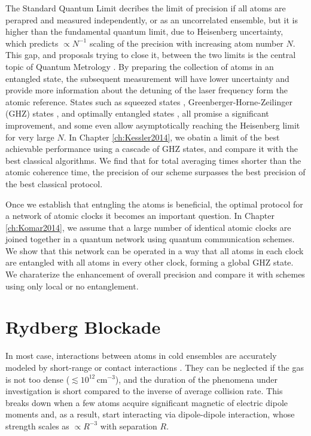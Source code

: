 The Standard Quantum Limit decribes the limit of precision if all atoms are
perapred and measured independently, or as an uncorrelated ensemble, but it is
higher than the fundamental quantum limit, due to Heisenberg uncertainty, which
predicts $\propto N^{-1}$ scaling of the precision with increasing atom number
$N$. This gap, and proposals trying to close it, between the two limits is the
central topic of Quantum Metrology \cite{Giovanetti2011, Escher:2011fn}. By
preparing the collection of atoms in an entangled state, the subsequent
measurement will have lower uncertainty and provide more information about the
detuning of the laser frequency form the atomic reference. States such as
squeezed states \cite{Andre2004, Borregaard2013_nearHeisenberg},
Greenberger-Horne-Zeilinger (GHZ) states \cite{Wineland1998, Bollinger1996}, and
optimally entangled states \cite{Buzek1999, Berry2009},
all promise a significant improvement, and some even allow asymptotically reaching the Heisenberg limit for very large
$N$. In Chapter \ref{ch:Kessler2014}, we obatin a limit of the best achievable
performance using a cascade of GHZ states, and compare it with the best
classical algorithms. We find that for total averaging times shorter than the
atomic coherence time, the precision of our scheme surpasses the best
precision of the best classical protocol.

Once we establish that entngling the atoms is beneficial, the optimal
protocol for a network of atomic clocks it becomes an important question. In
Chapter \ref{ch:Komar2014}, we assume that a large number of identical atomic
clocks are joined together in a quantum network using quantum communication
schemes. We show that this network can be operated in a way that all atoms in
each clock are entangled with all atoms in every other clock, forming a global
GHZ state. We charaterize the enhancement of overall precision and compare it
with schemes using only local or no entanglement.





\section{Rydberg Blockade}
In most case, interactions between atoms in cold ensembles are accurately
modeled by short-range or contact interactions \cite{Cheng2010}.
They can be neglected if the gas is not too dense ($ \lesssim
10^{12}\,\mathrm{cm}^{-3}$), and the duration of the phenomena under
investigation is short compared to the inverse of average collision rate. This
breaks down when a few atoms acquire significant magnetic of electric dipole
moments and, as a result, start interacting via dipole-dipole interaction, whose
strength scales as $\propto R^{-3}$ with separation $R$.

